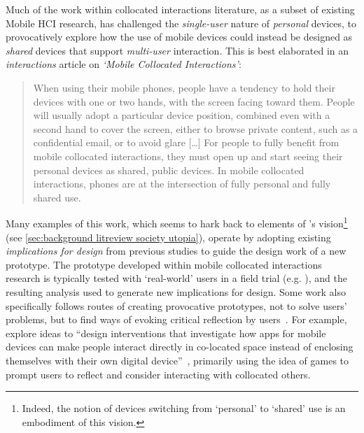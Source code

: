 \label{line:singleuser}Much of the work within collocated interactions literature, as a subset of existing Mobile \ac{HCI} research, has challenged the \textit{single-user} nature of \textit{personal} devices, to provocatively explore how the use of mobile devices could instead be designed as \textit{shared} devices that support \textit{multi-user} interaction. This is best elaborated in an \textit{interactions} article on \textit{`Mobile Collocated Interactions'}:
\begin{quote}
    When using their mobile phones, people have a tendency to hold their devices with one or two hands, with the screen facing toward them. People will usually adopt a particular device position, combined even with a second hand to cover the screen, either to browse private content, such as a confidential email, or to avoid glare [\ldots] For people to fully benefit from mobile collocated interactions, they must open up and start seeing their personal devices as shared, public devices. In mobile collocated interactions, phones are at the intersection of fully personal and fully shared use.
\end{quote}
Many examples of this work, which seems to hark back to elements of \citet{Weiser1991}'s vision\footnote{
Indeed, the notion of devices switching from `personal' to `shared' use is an embodiment of this vision.} (see \ref{sec:background litreview society utopia}), operate by adopting existing \textit{implications for design} from previous studies to guide the design work of a new prototype.
The prototype developed within mobile collocated interactions research is typically tested with `real-world' users in a field trial (e.g. \citet{Lucero2012}), and the resulting analysis used to generate new implications for design.
Some work also specifically follows routes of creating provocative prototypes, not to solve users' problems, but to find ways of evoking critical reflection by users~\citep{Redstrom2006}.
For example, \citet{Lundgren2013} explore ideas to ``design interventions that investigate how apps for mobile devices can make people interact directly in co-located space instead of enclosing themselves with their own digital device''~\citep[p. 1]{Lundgren2013}, primarily using the idea of games to prompt users to reflect and consider interacting with collocated others.


